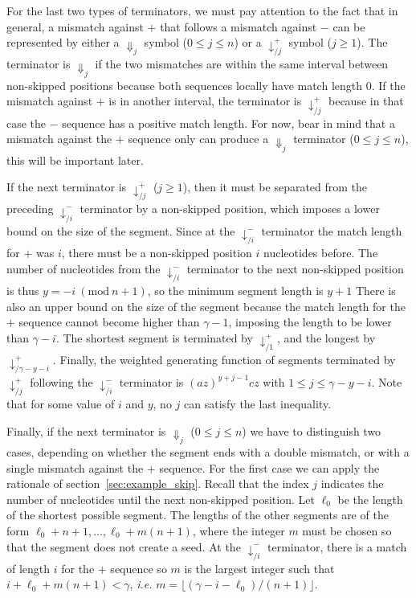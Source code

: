 \documentclass{article}
\newcommand{\modulo}[1]{\ (\mathrm{mod}\ #1)}
\begin{document}
For the last two types of terminators, we must pay attention to the fact
that in general, a mismatch against $+$ that follows a mismatch against
$-$ can be represented by either a $\Downarrow_j$ symbol ($0 \leq j \leq
n$) or a $\downarrow_{/j}^+$ symbol ($j \geq 1$). The terminator is
$\Downarrow_j$ if the two mismatches are within the same interval between
non-skipped positions because both sequences locally have match length 0.
If the mismatch against $+$ is in another interval, the terminator is
$\downarrow_{/j}^+$ because in that case the $-$ sequence has a positive
match length. For now, bear in mind that a mismatch against the $+$
sequence only can produce a $\Downarrow_j$ terminator ($0 \leq j \leq n$),
this will be important later.

If the next terminator is $\downarrow_{/j}^+$ ($j \geq 1$), then it must
be separated from the  preceding $\downarrow_{/i}^-$ terminator by a
non-skipped position, which imposes a lower bound on the size of the
segment. Since at the $\downarrow_{/i}^-$ terminator the match length for
$+$ was $i$, there must be a non-skipped position $i$ nucleotides before.
The number of nucleotides from the $\downarrow_{/i}^-$ terminator to the
next non-skipped position is thus $y = -i \modulo{n+1}$, so the minimum
segment length is $y+1$ There is also an upper bound on the size of the
segment because the match length for the $+$ sequence cannot become higher
than $\gamma-1$, imposing the length to be lower than $\gamma-i$. The
shortest segment is terminated by $\downarrow_{/1}^+$, and the longest by
$\downarrow_{/{\gamma-y-i}}^+$. Finally, the weighted generating function
of segments terminated by $\downarrow_{/j}^+$ following the
$\downarrow_{/i}^-$ terminator is $(az)^{y+j-1}cz$ with $1 \leq j \leq
\gamma-y-i$. Note that for some value of $i$ and $y$, no $j$ can satisfy
the last inequality.

Finally, if the next terminator is $\Downarrow_j$ ($0 \leq j \leq n$) we
have to distinguish two cases, depending on whether the segment ends with
a double mismatch, or with a single mismatch against the $+$ sequence. For
the first case we can apply the rationale of
section~\ref{sec:example_skip}. Recall that the index $j$ indicates the
number of nucleotides until the next non-skipped position. Let $\ell_0$ be
the length of the shortest possible segment. The lengths of the other
segments are of the form $\ell_0 + n+1, \ldots, \ell_0 + m(n+1)$, where
the integer $m$ must be chosen so that the segment does not create a seed.
At the $\downarrow_{/i}^-$ terminator, there is a match of length $i$ for
the $+$ sequence so $m$ is the largest integer such that $i+\ell_0+m(n+1)
< \gamma$, \textit{i.e.} $m = \lfloor(\gamma-i-\ell_0) / (n+1)\rfloor$.
\end{document}
